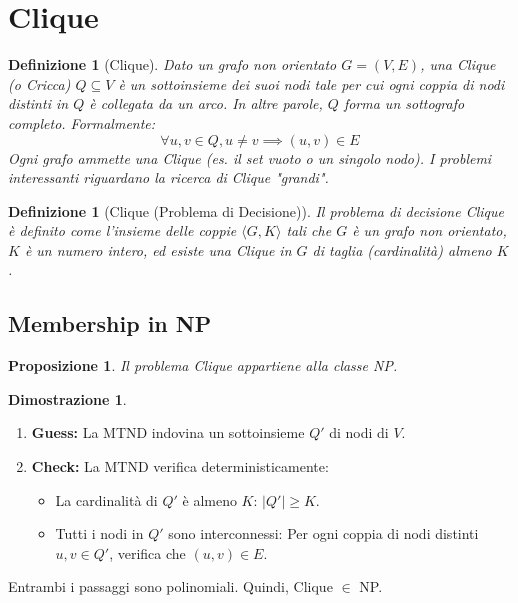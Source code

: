 \documentclass[a4paper, 11pt]{book} %
\newtheorem{definition}[theorem]{Definizione}
\newtheorem{proposition}[theorem]{Proposizione}
\theoremstyle{definition}
\newtheorem*{proof*}{Dimostrazione}
\begin{document}
\section{Clique}

\begin{definition}[Clique]
Dato un grafo non orientato $G=(V, E)$, una \emph{Clique} (o Cricca) $Q \subseteq V$ è un sottoinsieme dei suoi nodi tale per cui ogni coppia di nodi distinti in $Q$ è collegata da un arco. In altre parole, $Q$ forma un sottografo completo. Formalmente:
\[ \forall u, v \in Q, u \ne v \implies (u, v) \in E \]
Ogni grafo ammette una Clique (es. il set vuoto o un singolo nodo). I problemi interessanti riguardano la ricerca di Clique "grandi".
\end{definition}

\begin{definition}[Clique (Problema di Decisione)]
Il problema di decisione \emph{Clique} è definito come l'insieme delle coppie $\langle G, K \rangle$ tali che $G$ è un grafo non orientato, $K$ è un numero intero, ed esiste una Clique in $G$ di taglia (cardinalità) almeno $K$.
\end{definition}

\subsection{Membership in NP}

\begin{proposition}
Il problema \emph{Clique} appartiene alla classe NP.
\end{proposition}

\begin{proof*}
\begin{enumerate}
    \item \textbf{Guess:} La MTND indovina un sottoinsieme $Q'$ di nodi di $V$.
    \item \textbf{Check:} La MTND verifica deterministicamente:
    \begin{itemize}
        \item La cardinalità di $Q'$ è almeno $K$: $|Q'| \ge K$.
        \item Tutti i nodi in $Q'$ sono interconnessi: Per ogni coppia di nodi distinti $u, v \in Q'$, verifica che $(u, v) \in E$.
    \end{itemize}
\end{enumerate}
Entrambi i passaggi sono polinomiali. Quindi, Clique $\in$ NP.
\end{proof*}
\end{document}
